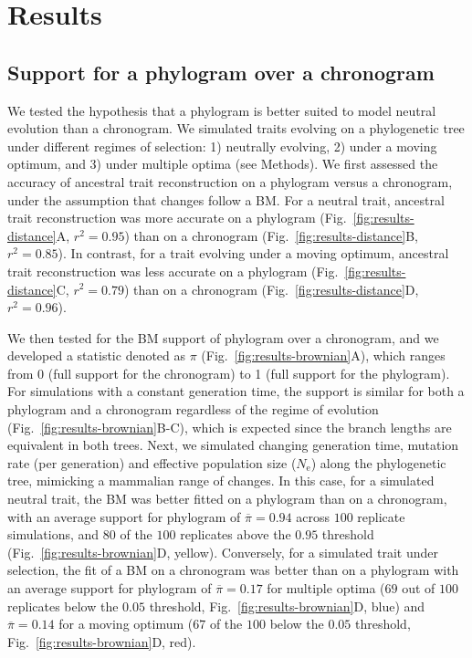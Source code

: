 \documentclass{article}
\newcommand{\Ne}{N_{\text{e}}}
\newcommand{\PhyloSupport}{\pi}
\newcommand{\MeanPhyloSupport}{\overline{\PhyloSupport}}
\begin{document}
\section*{Results}

\subsection*{Support for a phylogram over a chronogram}
We tested the hypothesis that a phylogram is better suited to model neutral evolution than a chronogram.
We simulated traits evolving on a phylogenetic tree under different regimes of selection: 1) neutrally evolving, 2) under a moving optimum, and 3) under multiple optima (see Methods).
We first assessed the accuracy of ancestral trait reconstruction on a phylogram versus a chronogram, under the assumption that changes follow a BM.
For a neutral trait, ancestral trait reconstruction was more accurate on a phylogram (Fig.~\ref{fig:results-distance}A, $r^2=0.95$) than on a chronogram (Fig.~\ref{fig:results-distance}B, $r^2=0.85$).
In contrast, for a trait evolving under a moving optimum, ancestral trait reconstruction was less accurate on a phylogram (Fig.~\ref{fig:results-distance}C, $r^2=0.79$) than on a chronogram (Fig.~\ref{fig:results-distance}D, $r^2=0.96$).

We then tested for the BM support of phylogram over a chronogram, and we developed a statistic denoted as $\PhyloSupport$ (Fig.~\ref{fig:results-brownian}A), which ranges from 0 (full support for the chronogram) to 1 (full support for the phylogram).
For simulations with a constant generation time, the support is similar for both a phylogram and a chronogram regardless of the regime of evolution (Fig.~\ref{fig:results-brownian}B-C), which is expected since the branch lengths are equivalent in both trees.
Next, we simulated changing generation time, mutation rate (per generation) and effective population size ($\Ne$) along the phylogenetic tree, mimicking a mammalian range of changes.
In this case, for a simulated neutral trait, the BM was better fitted on a phylogram than on a chronogram, with an average support for phylogram of $\MeanPhyloSupport = 0.94$ across $100$ replicate simulations, and $80$ of the $100$ replicates above the $0.95$ threshold (Fig.~\ref{fig:results-brownian}D, yellow).
Conversely, for a simulated trait under selection, the fit of a BM on a chronogram was better than on a phylogram with an average support for phylogram of $\MeanPhyloSupport = 0.17$ for multiple optima ($69$ out of $100$ replicates below the $0.05$ threshold, Fig.~\ref{fig:results-brownian}D, blue) and $\MeanPhyloSupport = 0.14$ for a moving optimum ($67$ of the $100$ below the $0.05$ threshold, Fig.~\ref{fig:results-brownian}D, red).
\end{document}
